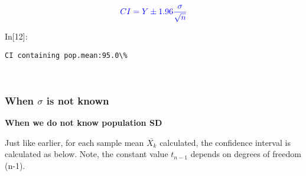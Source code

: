 \documentclass[float=false,crop=false]{standalone}
\begin{document}
\begin{equation}
\color{blue}{CI = Y \pm 1.96 \dfrac{\sigma}{\sqrt{n}}}  
\end{equation}
\begin{InVerbatim}[commandchars=\\\{\},fontsize=\scriptsize]
{\color{incolor}In[{\color{incolor}12}]:}    
         
             
         
           
\end{InVerbatim}
    \begin{Verbatim}[commandchars=\\\{\},fontsize=\footnotesize]
CI containing pop.mean:95.0\%

    \end{Verbatim}

    \begin{center}
    \end{center}
    { \hspace*{\fill} \\}
    
    \subsubsection{\texorpdfstring{When \(\sigma\) is not
known}{When \textbackslash{}sigma is not known}}\label{when-sigma-is-not-known}

\textbf{When we do not know population SD}

Just like earlier, for each sample mean \(\overline{X_k}\) calculated,
the confidence interval is calculated as below. Note, the constant value
\(t_{n-1}\) depends on degrees of freedom (n-1).
\end{document}

